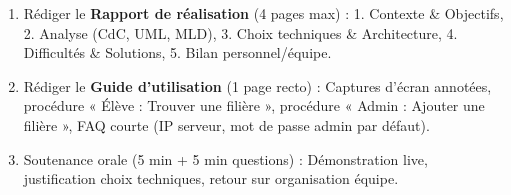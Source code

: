 \documentclass[11pt]{article}
\begin{document}
\begin{enumerate}
    \begin{enumerate}
        \item Rédiger le \textbf{Rapport de réalisation} (4 pages max) : 1. Contexte \& Objectifs, 2. Analyse (CdC, UML, MLD), 3. Choix techniques \& Architecture, 4. Difficultés \& Solutions, 5. Bilan personnel/équipe.
        \item Rédiger le \textbf{Guide d'utilisation} (1 page recto) : Captures d'écran annotées, procédure « Élève : Trouver une filière », procédure « Admin : Ajouter une filière », FAQ courte (IP serveur, mot de passe admin par défaut).
        \item Soutenance orale (5 min + 5 min questions) : Démonstration live, justification choix techniques, retour sur organisation équipe.
    \end{enumerate}
\end{enumerate}
\end{document}
